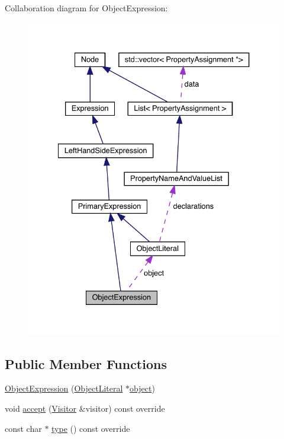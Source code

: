 Collaboration diagram for Object\+Expression\+:
\nopagebreak
\begin{figure}[H]
\begin{center}
\leavevmode
\includegraphics[width=334pt]{struct_object_expression__coll__graph}
\end{center}
\end{figure}
\subsection*{Public Member Functions}
\begin{DoxyCompactItemize}
\item 
\hyperlink{struct_object_expression_a6fc7ddf18ed9892b85ba64d1d8e0a33b}{Object\+Expression} (\hyperlink{struct_object_literal}{Object\+Literal} $\ast$\hyperlink{struct_object_expression_abd6be2f4cbb70b2ca388d57270bbf17c}{object})
\item 
void \hyperlink{struct_object_expression_a360acff3bec82217a5adf58218aed49d}{accept} (\hyperlink{struct_visitor}{Visitor} \&visitor) const override
\item 
const char $\ast$ \hyperlink{struct_object_expression_ad232045e9914b06cfe8d7028ede2c365}{type} () const override
\end{DoxyCompactItemize}
